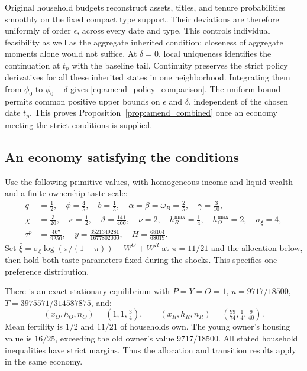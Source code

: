 \documentclass[11pt]{article}
\begin{document}
Original household budgets reconstruct assets, titles, and tenure
probabilities smoothly on the fixed compact type support. Their deviations
are therefore uniformly of order $\epsilon$, across every date and type.
This controls individual feasibility as well as the aggregate inherited
condition; closeness of aggregate moments alone would not suffice.
At $\delta=0$, local uniqueness identifies the continuation at $t_p$ with
the baseline tail. Continuity preserves the strict policy derivatives for
all these inherited states in one neighborhood. Integrating them from
$\phi_0$ to $\phi_0+\delta$ gives
\eqref{eq:amend_policy_comparison}. The uniform bound permits common positive
upper bounds on $\epsilon$ and $\delta$, independent of the chosen date $t_p$.
This proves Proposition~\ref{prop:amend_combined} once an economy meeting the
strict conditions is supplied.

\subsection{An economy satisfying the conditions}

Use the following primitive values, with homogeneous income and liquid
wealth and a finite ownership-taste scale:
\begin{align}
 q&=\tfrac12,\quad\phi=\tfrac45,\quad b=\tfrac15,\quad
 \alpha=\beta=\omega_B=\tfrac25,\quad\gamma=\tfrac3{10},\nonumber\\
 \chi&=\tfrac3{20},\quad\kappa=\tfrac12,\quad
 \vartheta=\tfrac{141}{400},\quad\nu=2,\quad
 h_R^{\max}=\tfrac14,\quad h_O^{\max}=2,\quad\sigma_\xi=4,\nonumber\\
 \tau^p&=\tfrac{467}{9250},\quad
 y=\tfrac{3521349281}{1677802000},\quad
 \bar H=\tfrac{68104}{68019}.
 \label{eq:amend_example_primitives}
\end{align}
Set $\bar\xi=\sigma_\xi\log(\pi/(1-\pi))-W^O+W^R$ at
$\pi=11/21$ and the allocation below, then hold both taste parameters fixed
during the shocks. This specifies one preference distribution.

There is an exact stationary equilibrium with $P=Y=O=1$,
$u=9717/18500$, $T=3975571/314587875$, and:
\begin{equation}
 (x_O,h_O,n_O)=(1,1,\tfrac34),\qquad
 (x_R,h_R,n_R)=(\tfrac{99}{74},\tfrac14,\tfrac9{40}).
 \label{eq:amend_example_allocation}
\end{equation}
Mean fertility is $1/2$ and $11/21$ of households own. The young owner's
housing value is $16/25$, exceeding the old owner's value $9717/18500$.
All stated household inequalities have strict margins. Thus the allocation
and transition results apply in the same economy.
\end{document}
